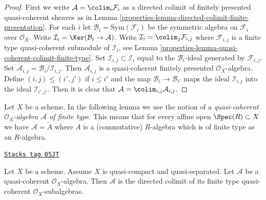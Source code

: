 \begin{proof}

First we write $\mathcal{A} = \colim_i \mathcal{F}_i$ as a directed
colimit of finitely presented quasi-coherent sheaves as in
Lemma \ref{properties-lemma-directed-colimit-finite-presentation}.
For each $i$ let $\mathcal{B}_i = \text{Sym}(\mathcal{F}_i)$ be the
symmetric algebra on $\mathcal{F}_i$ over $\mathcal{O}_X$. Write
$\mathcal{I}_i = \Ker(\mathcal{B}_i \to \mathcal{A})$. Write
$\mathcal{I}_i = \colim_j \mathcal{F}_{i, j}$ where
$\mathcal{F}_{i, j}$ is a finite type quasi-coherent submodule of
$\mathcal{I}_i$, see
Lemma \ref{properties-lemma-quasi-coherent-colimit-finite-type}.
Set $\mathcal{I}_{i, j} \subset \mathcal{I}_i$
equal to the $\mathcal{B}_i$-ideal generated by $\mathcal{F}_{i, j}$.
Set $\mathcal{A}_{i, j} = \mathcal{B}_i/\mathcal{I}_{i, j}$.
Then $\mathcal{A}_{i, j}$ is a quasi-coherent finitely presented
$\mathcal{O}_X$-algebra. Define $(i, j) \leq (i', j')$ if
$i \leq i'$ and the map $\mathcal{B}_i \to \mathcal{B}_{i'}$
maps the ideal $\mathcal{I}_{i, j}$ into the ideal $\mathcal{I}_{i', j'}$.
Then it is clear that $\mathcal{A} = \colim_{i, j} \mathcal{A}_{i, j}$.
\end{proof}

Let $X$ be a scheme. In the following lemma we use the notion
of a {\it quasi-coherent $\mathcal{O}_X$-algebra $\mathcal{A}$
of finite type}. This means that for every affine open
$\Spec(R) \subset X$ we have $\mathcal{A} = \widetilde{A}$
where $A$ is a (commutative) $R$-algebra which is of finite type
as an $R$-algebra.

\begin{lemma}
\label{properties-lemma-algebra-directed-colimit-finite-type}
\href{https://stacks.math.columbia.edu/tag/05JT}{\texttt{Stacks tag 05JT}}

Let $X$ be a scheme. Assume $X$ is quasi-compact and quasi-separated.
Let $\mathcal{A}$ be a quasi-coherent $\mathcal{O}_X$-algebra.
Then $\mathcal{A}$ is the directed colimit of its finite type
quasi-coherent $\mathcal{O}_X$-subalgebras.
\end{lemma}

